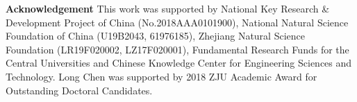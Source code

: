 \documentclass[10pt,twocolumn,letterpaper]{article}
\begin{document}
\footnotesize \noindent\textbf{Acknowledgement} This work was supported by National Key Research \& Development Project of China (No.2018AAA0101900), National Natural Science Foundation of China (U19B2043, 61976185), Zhejiang Natural Science Foundation (LR19F020002, LZ17F020001), Fundamental Research Funds for the Central Universities and Chinese Knowledge Center for Engineering Sciences and Technology. Long Chen was supported by 2018 ZJU Academic Award for Outstanding Doctoral Candidates.

{\small


}
\end{document}
